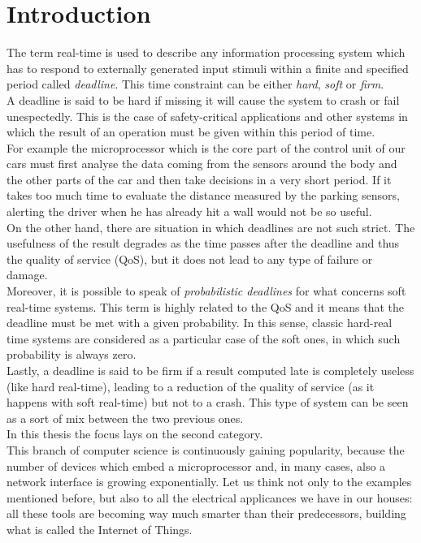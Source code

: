 \chapter{Introduction}\label{chp:introduction}


The term real-time is used to describe any information processing system which has to respond to externally generated input stimuli within a finite and specified period called \emph{deadline}.
This time constraint can be either \emph{hard}, \emph{soft} or \emph{firm}.\\
A deadline is said to be hard if missing it will cause the system to crash or fail unespectedly. This is the case of safety-critical applications and other systems in which the result of an operation must be given within this period of time.\\
For example the microprocessor which is the core part of the control unit of our cars must first analyse the data coming from the sensors around the body and the other parts of the car and then take decisions in a very short period. If it takes too much time to evaluate the distance measured by the parking sensors, alerting the driver when he has already hit a wall would not be so useful.\\
On the other hand, there are situation in which deadlines are not such strict. The usefulness of the result degrades as the time passes after the deadline and thus the quality of service (QoS), but it does not lead to any type of failure or damage.\\
Moreover, it is possible to speak of \emph{probabilistic deadlines} for what concerns soft real-time systems. This term is highly related to the QoS and it means that the deadline must be met with a given probability. In this sense, classic hard-real time systems are considered as a particular case of the soft ones, in which such probability is always zero.\\ 
Lastly, a deadline is said to be firm if a result computed late is completely useless (like hard real-time), leading to a reduction of the quality of service (as it happens with soft real-time) but not to a crash. This type of system can be seen as a sort of mix between the two previous ones.\\
In this thesis the focus lays on the second category.\\
This branch of computer science is continuously gaining popularity, because the number of devices which embed a microprocessor and, in many cases, also a network interface is growing exponentially. Let us think not only to the examples mentioned before, but also to all the electrical applicances we have in our houses: all these tools are becoming way much smarter than their predecessors, building what is called the Internet of Things.    